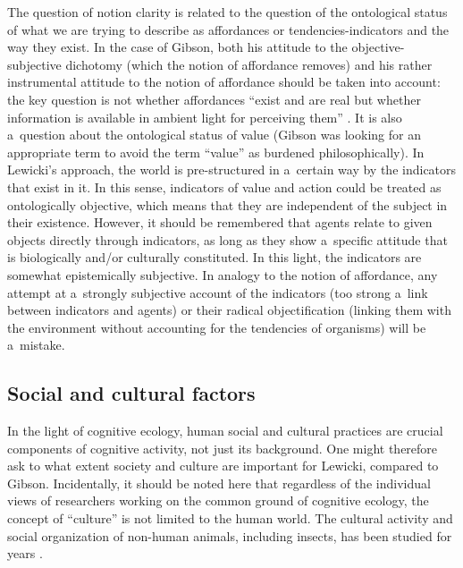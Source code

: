 \documentclass[%
manuscript=article,
year=2024,
volume=77,
doi=00000.000,
]{zfn}
\begin{document}
The question of notion clarity is related to the question of the ontological status of what we are trying to describe as affordances or tendencies-indicators and the way they exist. In the case of Gibson, both his attitude to the objective-subjective dichotomy (which the notion of affordance removes) and his rather instrumental attitude to the notion of affordance should be taken into account: the key question is not whether affordances ``exist and are real but whether information is available in ambient light for perceiving them'' 
\parencite[][p.140]{gibson_ecological_1979}. %
 It is also a~question about the ontological status of value (Gibson was looking for an appropriate term to avoid the term ``value'' as burdened philosophically). In Lewicki's approach, the world is pre-structured in a~certain way by the indicators that exist in it. In this sense, indicators of value and action could be treated as ontologically objective, which means that they are independent of the subject in their existence. However, it should be remembered that agents relate to given objects directly through indicators, as long as they show a~specific attitude that is biologically and/or culturally constituted. In this light, the indicators are somewhat epistemically subjective. In analogy to the notion of affordance, any attempt at a~strongly subjective account of the indicators (too strong a~link between indicators and agents) or their radical objectification (linking them with the environment without accounting for the tendencies of organisms) will be a~mistake.



\subsection{Social and cultural factors}



In the light of cognitive ecology, human social and cultural practices are crucial components of cognitive activity, not just its background. One might therefore ask to what extent society and culture are important for Lewicki, compared to Gibson. Incidentally, it should be noted here that regardless of the individual views of researchers working on the common ground of cognitive ecology, the concept of ``culture'' is not limited to the human world. The cultural activity and social organization of non-human animals, including insects, has been studied for years 
\parencite[see e.g.,][]{zuk_sex_2011}.%
\end{document}
